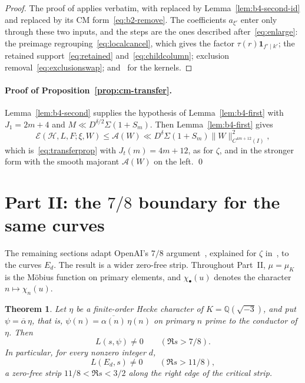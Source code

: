 \documentclass[11pt]{article}
\numberwithin{equation}{section}
\newcommand{\muk}{\mu_K}
\newcommand{\ind}{\mathbf1}
\newcommand{\E}{\mathcal E}
\newtheorem{theorem}{Theorem}
\begin{document}
\begin{proof}
The proof of \cite[Lemma~7.3]{OAI1112} applies verbatim, with \cite[Lemma~7.2]{OAI1112} replaced by
Lemma~\ref{lem:b4-second-id} and \cite[Lemma~4.4]{OAI1112} replaced by its CM form~\eqref{eq:b2-remove}.
The coefficients $a_{\xi'}$ enter only through these two inputs, and the steps are the ones described
after~\eqref{eq:enlarge}: the preimage regrouping~\eqref{eq:localcancel}, which gives the factor
$\tau(r)\ind_{f'\mid k'}$; the retained support~\eqref{eq:retained} and~\eqref{eq:childcolumn}; exclusion
removal~\eqref{eq:exclusionswap}; and~\cite[Lemma~B.2]{OAI1112} for the kernels.
\end{proof}

\paragraph{Proof of Proposition~\ref{prop:cm-transfer}.} Lemma~\ref{lem:b4-second} supplies the
hypothesis of Lemma~\ref{lem:b4-first} with $J_1=2m+4$ and $M\ll D^{\delta/2}\Sigma(1+S_m)$. Then
Lemma~\ref{lem:b4-first} gives
\begin{equation}\label{eq:d070}
 \E(\mathcal H,L,F;\xi,W)\le\mathcal A(W)\ll D^{\delta}\Sigma(1+S_m)\|W\|_{C^{4m+12}(I)}^2,
\end{equation}
which is~\eqref{eq:transferprop} with $J_t(m)=4m+12$, as for $\zeta$, and in the stronger form with
the smooth majorant $\mathcal A(W)$ on the left. \qed

\clearpage
\section{Part II: the \texorpdfstring{$7/8$}{7/8} boundary for the same curves}\label{sec:78}

The remaining sections adapt OpenAI's $7/8$ argument~\cite{OAI78}, explained
for $\zeta$ in~\cite{G78}, to the curves $E_d$. The result is a wider
zero-free strip. Throughout Part~II, $\mu=\muk$ is the M\"obius function on primary
elements, and $\chi_\bullet(u)$ denotes the character $n\mapsto\chi_n(u)$.

\begin{theorem}\label{thm:78}
Let $\eta$ be a finite-order Hecke character of $K=\mathbb Q(\sqrt{-3})$, and put
$\psi=\overline\alpha\,\eta$, that is, $\psi(n)=\overline{\alpha(n)}\,\eta(n)$ on
primary $n$ prime to the conductor of $\eta$. Then
\begin{equation}\label{eq:d071}
 L(s,\psi)\ne0\qquad(\Re s>7/8).
\end{equation}
In particular, for every nonzero integer $d$,
\begin{equation}\label{eq:d072}
 L(E_d,s)\ne0\qquad(\Re s>11/8),
\end{equation}
a zero-free strip $11/8<\Re s<3/2$ along the right edge of the critical strip.
\end{theorem}
\end{document}
